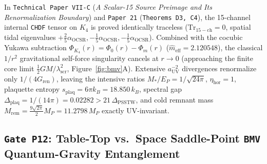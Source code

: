 \documentclass[11pt,a4paper]{article}
\begin{document}
In \texttt{Technical Paper VII-C} (\emph{A Scalar-15 Source Preimage and Its Renormalization Boundary}) and \texttt{Paper 21} (\texttt{Theorems D3, C4}), the 15-channel internal \texttt{CHDF} tensor on $K_4$ is proved identically traceless ($\mathrm{Tr}_{\mathrm{15-ch}}=0$, spatial tidal eigenvalues $+\frac{2}{5}\alpha_{\mathrm{OCSR}},-\frac{1}{5}\alpha_{\mathrm{OCSR}},-\frac{1}{5}\alpha_{\mathrm{OCSR}}$). Combined with the cocubic Yukawa subtraction $\Phi_{K_4}(r)=\Phi_0(r)-\Phi_m(r)$ ($\hat{m}_{\mathrm{eff}}=2.120548$), the classical $1/r^2$ gravitational self-force singularity cancels at $r\to 0$ (approaching the finite core limit $\frac{1}{2}GM/\lambda_{\mathrm{scr}}^2$, Figure~\ref{fig:bmv}A). Extensive $a_{\mathrm{UV}}^{-2}$ divergences renormalize only $1/(4G_{\mathrm{ren}})$, leaving the intensive ratios $M_*/E_P = 1/\sqrt{24\pi}$, $\eta_{\mathrm{hor}}=1$, plaquette entropy $s_{\mathrm{plaq}}=6\pi k_B = 18.850\,k_B$, spectral gap $\Delta_{\mathrm{plaq}} = 1/(14\pi) = 0.02282 > 21\,\Delta_{\mathrm{PSSTW}}$, and cold remnant mass $M_{\mathrm{rem}} = \frac{9\sqrt{2\pi}}{2}M_P = 11.2798\,M_P$ exactly UV-invariant.

\subsection{\texttt{Gate P12}: Table-Top vs.\ Space Saddle-Point \texttt{BMV} Quantum-Gravity Entanglement}
\end{document}
